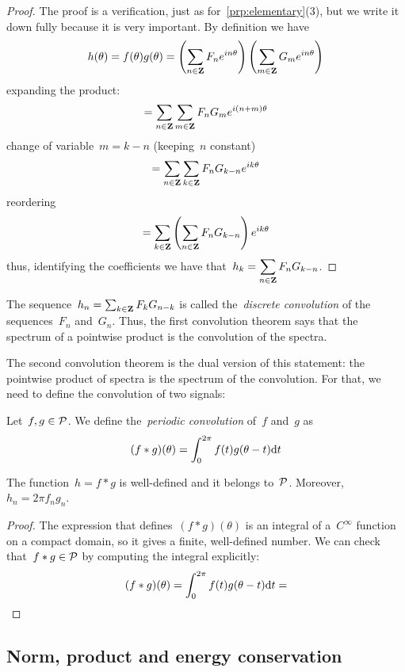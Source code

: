 \begin{proof}
	The proof is a verification, just as for~\ref{prp:elementary}(3), but
	we write it down fully because it is very important.  By definition we
	have
	\[
		h(\theta)=f(\theta)g(\theta)
		=
		\left(\sum_{n\in\mathbf{Z}}F_ne^{in\theta}\right)
		\left(\sum_{m\in\mathbf{Z}}G_me^{in\theta}\right)
	\]
	expanding the product:
	\[
		=
		\sum_{n\in\mathbf{Z}}\sum_{m\in\mathbf{Z}} F_n G_m e^{i(n+m)\theta}
	\]
	change of variable~$m=k-n$ (keeping~$n$ constant)
	\[
		=\sum_{n\in\mathbf{Z}}\sum_{k\in\mathbf{Z}} F_n G_{k-n} e^{ik\theta}
	\]
	reordering
	\[
		=\sum_{k\in\mathbf{Z}}\left(\sum_{n\in\mathbf{Z}} F_n G_{k-n}\right)e^{ik\theta}
	\]
	thus, identifying the coefficients we have
	that~$\displaystyle h_k=\sum_{n\in\mathbf{Z}} F_n G_{k-n}$.
\end{proof}

The sequence~$h_n=\sum_{k\in\mathbf{Z}} F_k G_{n-k}$ is called the~\emph{discrete
convolution} of the sequences~$F_n$ and~$G_n$.  Thus, the first convolution
theorem says that the spectrum of a pointwise product is the convolution of the
spectra.

The second convolution theorem is the dual version of this statement: the
pointwise product of spectra is the spectrum of the convolution.  For that, we
need to define the convolution of two signals:

\begin{definition}
	Let~$f,g\in\mathcal{P}$.  We define the~\emph{periodic convolution} of~$f$
	and~$g$ as
	\[
		(f*g)(\theta)=\int_0^{2\pi}f(t)g(\theta-t)\mathrm{d} t
	\]
\end{definition}

\begin{proposition}
	The function~$h=f*g$ is well-defined and it belongs to~$\mathcal{P}$.
	Moreover,~$h_n=2\pi f_n g_n$.
\end{proposition}

\begin{proof}
	The expression that defines~$(f*g)(\theta)$ is an integral of
	a~$C^\infty$ function on a compact domain, so it gives a finite,
	well-defined number.  We can check that~$f*g\in\mathcal{P}$ by computing the
	integral explicitly:
	\[
		(f*g)(\theta)=\int_0^{2\pi}f(t)g(\theta-t)\mathrm{d} t
		=
	\]
\end{proof}


\subsection{Norm, product and energy conservation}


